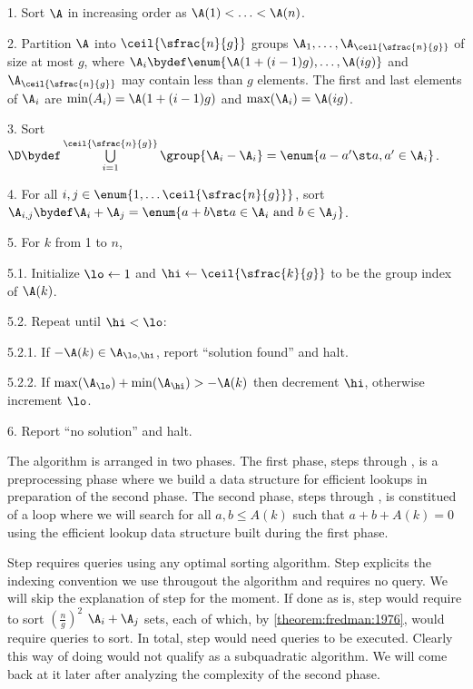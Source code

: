 \begin{algorithm}

\item[1.] Sort $\A$ in increasing order as $\A(1) < \ldots < \A(n)$.

\item[2.] Partition $\A$ into $\ceil{\sfrac{n}{g}}$ groups $\A_1, \ldots,
\A_{\ceil{\sfrac{n}{g}}}$ of size at most $g$, where $\A_i \bydef \enum{\A(1 + (i-1)g),
\ldots, \A(ig)}$ and $\A_{\ceil{\sfrac{n}{g}}}$ may contain less than $g$ elements.
The first and last elements of $\A_i$ are $\min(A_i) = \A(1 + (i-1)g)$ and
$\max(\A_i) = \A(ig)$.

\item[3.] Sort $\D \bydef \bigcup\limits_{i = 1}^{\ceil{\sfrac{n}{g}}}
\group{\A_i-\A_i} = \enum{a - a' \st a, a' \in \A_i}$.

\item[4.] For all $i,j \in \enum{1, \ldots \ceil{\sfrac{n}{g}}}$, sort $\A_{i,j}
\bydef \A_i + \A_j = \enum{a + b \st a \in \A_i \text{ and } b \in \A_j}$.

\item[5.] For $k$ from 1 to $n$,

\item[5.1.] Initialize $\lo \gets 1$ and $\hi \gets \ceil{\sfrac{k}{g}}$ to be
the group index of $\A(k)$.

\item[5.2.] Repeat until $\hi < \lo$:

\item[5.2.1.] If $-\A(k) \in \A_{\lo,\hi}$, report ``solution found'' and halt.

\item[5.2.2.] If $\max(\A_{\lo}) + \min(\A_{\hi}) > -\A(k)$ then decrement
$\hi$, otherwise increment $\lo$.

\item[6.] Report ``no solution'' and halt.

\end{algorithm}

The algorithm is arranged in two phases. The first phase, steps 
through , is a preprocessing phase where we build a data structure
for efficient lookups in preparation of the second phase. The second phase, steps
 through , is constitued of a loop where we will search
for all $a, b \le A(k)$ such that $a + b + A(k) = 0$ using the efficient lookup
data structure built during the first phase.

Step  requires  queries using any optimal sorting
algorithm. Step  explicits
the indexing convention we use througout the algorithm and requires no query.
We will skip the explanation of step  for the moment. If done as is,
step  would require to sort $(\frac{n}{g})^2$ $\A_i + \A_j$ sets,
each of which, by \ref{theorem:fredman:1976}, would require  queries
to sort. In total, step  would need  queries to be
executed. Clearly this way of doing would not qualify as a subquadratic
algorithm. We will come back at it later after analyzing the complexity of the
second phase.


